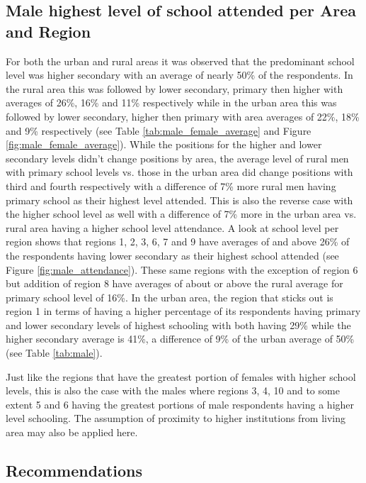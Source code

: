 \documentclass[stu, 12pt, floatsintext,longtable]{apa7}
\begin{document}
\subsection{Male highest level of school attended per Area and Region}
For both the urban and rural areas it was observed that the predominant school
level was higher secondary with an average of nearly 50\% of the respondents.
In the rural area this was followed by lower secondary, primary then higher
with averages of 26\%, 16\% and 11\% respectively while in the
urban area this was followed by lower secondary, higher then primary with area
averages of 22\%, 18\% and 9\%
respectively (see Table \ref{tab:male_female_average} and Figure
\ref{fig:male_female_average}).
While the positions for the higher and lower secondary levels didn't change
positions
by area, the average level of rural men with primary school levels vs. those in
the urban area did
change positions with third and fourth respectively with a difference of 7\%
more rural men
having primary school as their highest level attended. This is also the reverse
case with the higher school level as
well with a difference of 7\% more in the urban area vs. rural area having a
higher school level attendance.
A look at school level per region shows that regions 1, 2, 3, 6, 7 and 9 have
averages of and above 26\%
of the respondents having lower secondary as their highest school attended (see
Figure \ref{fig:male_attendance}).
These same regions with the exception of region 6 but addition of region 8 have
averages of
about or above the rural average for primary school level of 16\%.
In the urban area, the region that sticks out is region 1 in terms of having a
higher
percentage of its respondents having primary and lower secondary levels of
highest
schooling with both
having 29\% while the higher secondary average is 41\%, a difference of 9\% of
the urban average of 50\% (see Table \ref{tab:male}).

Just like the regions that have the greatest portion of females with higher
school levels,
this is also the case with the males where regions 3, 4, 10 and to some extent
5
and 6 having the
greatest portions of male respondents having a higher level schooling.
The assumption of proximity to higher institutions from living area may also be
applied here.

\subsection{Recommendations}
\end{document}
